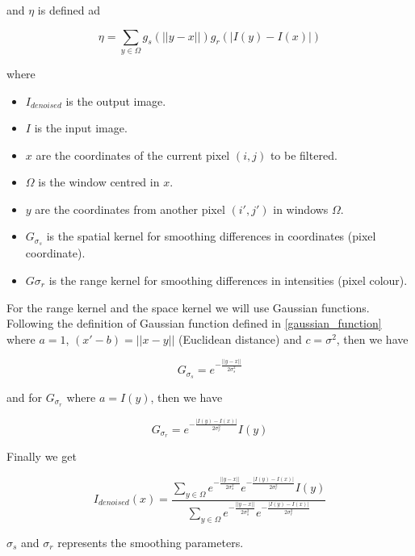 \documentclass[titlepage,12pt]{report}
\begin{document}
and $\eta$ is defined ad

\begin{equation}
\eta = \sum_{y \in \Omega} g_s(||y - x||) g_r(|I(y) - I(x)|)
\end{equation}

where

\begin{itemize}
\item  $I_{denoised}$ is the output image.
\item  $I$ is the input image.
\item $x$ are the coordinates of the current pixel $(i,j)$ to be filtered.
\item $\Omega$ is the window centred in $x$.
\item $y$ are the coordinates from another pixel $(i', j')$ in windows $\Omega$.
\item $G_{\sigma_s}$ is the spatial kernel for smoothing differences in coordinates (pixel coordinate).
\item $G{\sigma_r}$ is the range kernel for smoothing differences in intensities (pixel colour).

\end{itemize}

For the range kernel and the space kernel we will use Gaussian functions. Following the definition of Gaussian function defined in \ref{gaussian_function} where $a = 1$, $(x' - b) = ||x - y||$ (Euclidean distance) and $c = \sigma^2$, then we have

\begin{equation}
G_{\sigma_s} = e^{- \frac{||y - x||}{2 \sigma_{s}^{2}}}
\end{equation}

and for $G_{\sigma_r}$ where $a = I(y)$, then we have

\begin{equation}
G_{\sigma_r} = e^{- \frac{|I(y) - I(x)|}{2 \sigma_{r}^{2}}} I(y)
\end{equation}

Finally we get

\begin{equation}
I_{denoised}(x) = \frac{\sum_{y \in \Omega} e^{- \frac{||y - x||}{2 \sigma_{s}^{2}}} e^{- \frac{|I(y) - I(x)|}{2 \sigma_{r}^{2}}} I(y)}{\sum_{y \in \Omega}e^{- \frac{||y - x||}{2 \sigma_{s}^{2}}} e^{- \frac{|I(y) - I(x)|}{2 \sigma_{r}^{2}}}}
\end{equation}

$\sigma_s$ and $\sigma_r$ represents the smoothing parameters.
\end{document}
